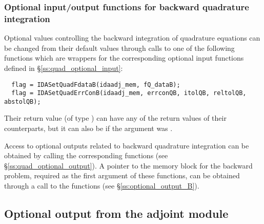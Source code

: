 \subsubsection{Optional input/output functions for backward quadrature integration}
Optional values controlling the backward integration of quadrature equations can be changed
from their default values through calls to one of the following functions which are wrappers for
the corresponding optional input functions defined in \S\ref{ss:quad_optional_input}:
\begin{verbatim}
  flag = IDASetQuadFdataB(idaadj_mem, fQ_dataB);
  flag = IDASetQuadErrConB(idaadj_mem, errconQB, itolQB, reltolQB, abstolQB);
\end{verbatim}
Their return value  (of type ) can have any of the return values 
of their counterparts, but it can also be  if the  
argument was . 

Access to optional outputs related to backward quadrature integration can be obtained
by calling the corresponding  functions 
(see \S\ref{ss:quad_optional_output}). 
A pointer to the {\idas} memory block for the backward problem, required as the first 
argument of these functions, can be obtained through a call to the functions 
 (see \S\ref{ss:optional_output_B}).

\subsection{Optional output from the adjoint module}
